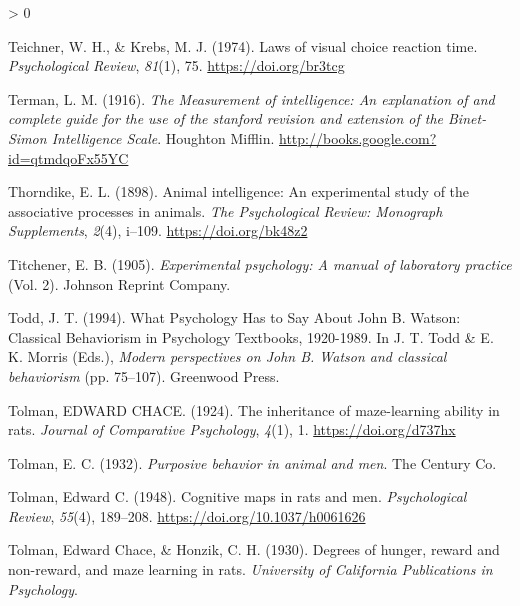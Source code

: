 \documentclass[
  oneside,
  12pt]{crumpbook}
\newlength{\cslhangindent}
\newenvironment{CSLReferences}[2] %
 {%
  \setlength{\parindent}{0pt}
  \ifodd #1 \everypar{\setlength{\hangindent}{\cslhangindent}}\ignorespaces\fi
  \ifnum #2 > 0
  \setlength{\parskip}{#2\baselineskip}
  \fi
 }%
 {}
\begin{document}
\begin{CSLReferences}{1}{0}
\leavevmode\hypertarget{ref-teichnerLawsVisualChoice1974}{}%
Teichner, W. H., \& Krebs, M. J. (1974). Laws of visual choice reaction time. \emph{Psychological Review}, \emph{81}(1), 75. \url{https://doi.org/br3tcg}

\leavevmode\hypertarget{ref-termanMeasurementIntelligenceExplanation1916}{}%
Terman, L. M. (1916). \emph{The {Measurement} of intelligence: {An} explanation of and complete guide for the use of the stanford revision and extension of the {Binet}-{Simon Intelligence Scale}}. {Houghton Mifflin}. \url{http://books.google.com?id=qtmdqoFx55YC}

\leavevmode\hypertarget{ref-thorndikeAnimalIntelligenceExperimental1898}{}%
Thorndike, E. L. (1898). Animal intelligence: {An} experimental study of the associative processes in animals. \emph{The Psychological Review: Monograph Supplements}, \emph{2}(4), i--109. \url{https://doi.org/bk48z2}

\leavevmode\hypertarget{ref-titchenerExperimentalPsychologyManual1905}{}%
Titchener, E. B. (1905). \emph{Experimental psychology: {A} manual of laboratory practice} (Vol. 2). {Johnson Reprint Company}.

\leavevmode\hypertarget{ref-toddWhatPsychologyHas1994}{}%
Todd, J. T. (1994). What {Psychology Has} to {Say About John B}. {Watson}: {Classical Behaviorism} in {Psychology Textbooks}, 1920-1989. In J. T. Todd \& E. K. Morris (Eds.), \emph{Modern perspectives on {John B}. {Watson} and classical behaviorism} (pp. 75--107). {Greenwood Press}.

\leavevmode\hypertarget{ref-tolmanInheritanceMazelearningAbility1924}{}%
Tolman, EDWARD CHACE. (1924). The inheritance of maze-learning ability in rats. \emph{Journal of Comparative Psychology}, \emph{4}(1), 1. \url{https://doi.org/d737hx}

\leavevmode\hypertarget{ref-tolmanPurposiveBehaviorAnimal1932}{}%
Tolman, E. C. (1932). \emph{Purposive behavior in animal and men}. {The Century Co.}

\leavevmode\hypertarget{ref-tolmanCognitiveMapsRats1948}{}%
Tolman, Edward C. (1948). Cognitive maps in rats and men. \emph{Psychological Review}, \emph{55}(4), 189--208. \url{https://doi.org/10.1037/h0061626}

\leavevmode\hypertarget{ref-tolmanDegreesHungerReward1930}{}%
Tolman, Edward Chace, \& Honzik, C. H. (1930). Degrees of hunger, reward and non-reward, and maze learning in rats. \emph{University of California Publications in Psychology}.


\end{CSLReferences}
\end{document}
